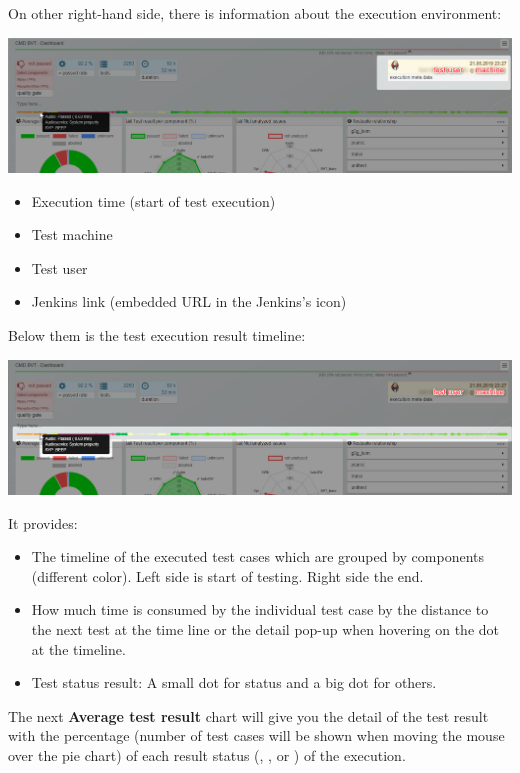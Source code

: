 On other right-hand side, there is information about the execution environment:

\includegraphics[width=1\linewidth]{./pictures/dashboard/result_environment.png}
\begin{itemize}
   \item Execution time (start of test execution)
   \item Test machine
   \item Test user
   \item Jenkins link (embedded URL in the Jenkins's icon)
\end{itemize}

Below them is the test execution result timeline:

\includegraphics[width=1\linewidth]{./pictures/dashboard/result_timeline.png}

It provides:
\begin{itemize}
   \item The timeline of the executed test cases which are grouped by components 
         (different color). Left side is start of testing. Right side the end.
   \item How much time is consumed by the individual test case by the distance 
         to the next test at the time line or the detail pop-up when hovering on the 
         dot at the timeline.
   \item Test status result: A small dot for  status and a big dot 
         for others.
\end{itemize}


The next \textbf{Average test result} chart will give you the detail of the test 
result with the percentage (number of test cases will be shown when moving the mouse 
over the pie chart) of each result status (, , 
 or ) of the execution. 

